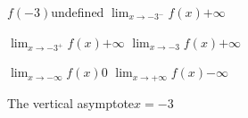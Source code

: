 \pairofprobsans%
{$\displaystyle f(-3)$}{undefined}
{$\displaystyle \lim_{x \rightarrow -3^-} f(x) $}{$\displaystyle +\infty$}

\pairofprobsans%
{$\displaystyle \lim_{x \rightarrow -3^+} f(x)$}{$\displaystyle +\infty$}
{$\displaystyle \lim_{x \rightarrow -3} f(x)$}{$\displaystyle +\infty$}

\pairofprobsans%
{$\displaystyle \lim_{x \rightarrow -\infty} f(x)$}{$\displaystyle 0$}
{$\displaystyle \lim_{x \rightarrow +\infty} f(x)$}{$\displaystyle -\infty$}

\problemans%
{The vertical asymptote}{$\displaystyle x=-3$}


